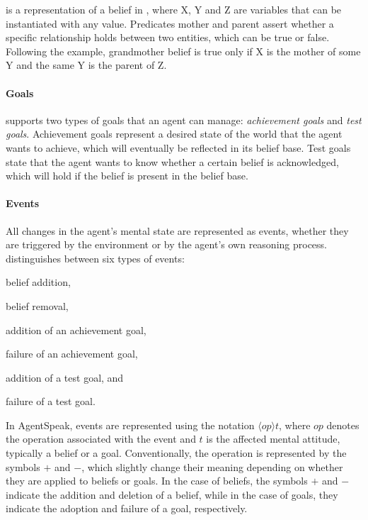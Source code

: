  is a representation of a belief in \agentspeak{}, 
where X, Y and Z are variables that can be instantiated with any value.
%
Predicates mother and parent assert whether a specific relationship holds between two entities, 
which can be true or false.
%
Following the example, 
grandmother belief is true only if X is the mother of some
Y and the same Y is the parent of Z.


\paragraph{Goals}
\agentspeak{} supports two types of goals that an agent can manage: \emph{achievement goals} and \emph{test goals}. 
%
Achievement goals represent a desired state of the world that the agent wants to achieve, 
which will eventually be reflected in its belief base. 
%
Test goals state that the agent wants to know whether a certain belief is acknowledged,
which will hold if the belief is present in the belief base.

\paragraph{Events}
All changes in the agent's mental state are represented as events,
whether they are triggered by the environment or by the agent's own reasoning process.
%
\agentspeak{} distinguishes between six types of events:
\begin{inlinelist}
    \item belief addition,
    \item belief removal,
    \item addition of an achievement goal,
    \item failure of an achievement goal,
    \item addition of a test goal,
    and
    \item failure of a test goal.
\end{inlinelist}

In AgentSpeak, events are represented using the notation $\langle op \rangle t$, 
where $op$ denotes the operation associated with the event 
and $t$ is the affected mental attitude, 
typically a belief or a goal. 
%
Conventionally, the operation is represented by the symbols $+$ and $-$,
which slightly change their meaning depending on whether they are applied to beliefs or goals.
%
In the case of beliefs,
the symbols $+$ and $-$ indicate the addition and deletion of a belief,
while in the case of goals,
they indicate the adoption and failure of a goal, respectively.

